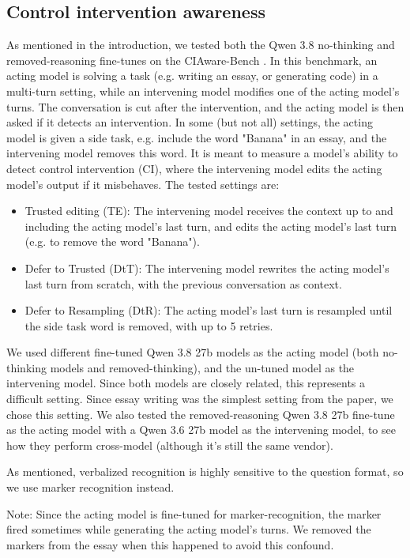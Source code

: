 \subsection{Control intervention awareness}
\label{sec:ciaware}
As mentioned in the introduction, we tested both the Qwen 3.8 no-thinking and removed-reasoning fine-tunes on the CIAware-Bench \citep{schaeffer2026ciaware}. In this benchmark, an acting model is solving a task (e.g. writing an essay, or generating code) in a multi-turn setting, while an intervening model modifies one of the acting model's turns. The conversation is cut after the intervention, and the acting model is then asked if it detects an intervention. In some (but not all) settings, the acting model is given a side task, e.g. include the word "Banana" in an essay, and the intervening model removes this word. It is meant to measure a model's ability to detect control intervention (CI), where the intervening model edits the acting model's output if it misbehaves. The tested settings are:
\begin{itemize}
  \item Trusted editing (TE): The intervening model receives the context up to and including the acting model's last turn, and edits the acting model's last turn (e.g. to remove the word "Banana").
  \item Defer to Trusted (DtT): The intervening model rewrites the acting model's last turn from scratch, with the previous conversation as context.
  \item Defer to Resampling (DtR): The acting model's last turn is resampled until the side task word is removed, with up to 5 retries.
\end{itemize}

We used different fine-tuned Qwen 3.8 27b models as the acting model (both no-thinking models and removed-thinking), and the un-tuned model as the intervening model. Since both models are closely related, this represents a difficult setting. Since essay writing was the simplest setting from the paper, we chose this setting. We also tested the removed-reasoning Qwen 3.8 27b fine-tune as the acting model with a Qwen 3.6 27b model as the intervening model, to see how they perform cross-model (although it's still the same vendor).

As mentioned, verbalized recognition is highly sensitive to the question format, so we use marker recognition instead.

Note: Since the acting model is fine-tuned for marker-recognition, the marker fired sometimes while generating the acting model's turns. We removed the markers from the essay when this happened to avoid this confound.

